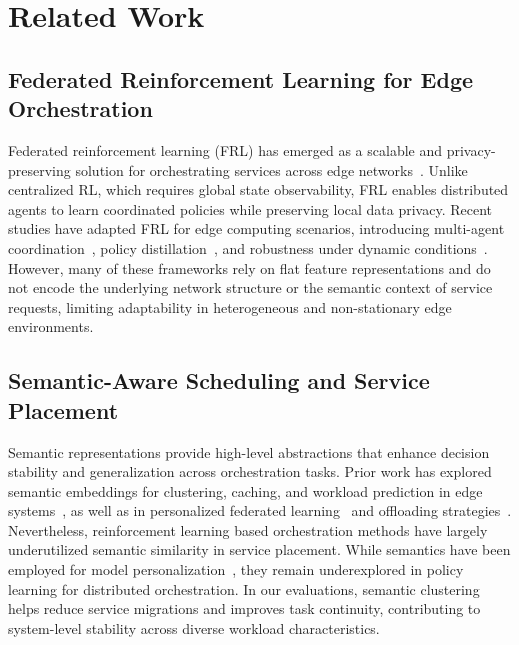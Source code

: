 \section{Related Work}
\label{sec:related}

\subsection{Federated Reinforcement Learning for Edge Orchestration}

Federated reinforcement learning (FRL) has emerged as a scalable and privacy-preserving solution for orchestrating services across edge networks~\cite{Wang2023_FedRLReview,Zhang2024_FedEdgeSurvey}. Unlike centralized RL, which requires global state observability, FRL enables distributed agents to learn coordinated policies while preserving local data privacy. Recent studies have adapted FRL for edge computing scenarios, introducing multi-agent coordination~\cite{Zhou2023_MARLFed}, policy distillation~\cite{Zhang2023_PolicyDistillFL}, and robustness under dynamic conditions~\cite{Nguyen2024_FedRLDynamic}. However, many of these frameworks rely on flat feature representations and do not encode the underlying network structure or the semantic context of service requests, limiting adaptability in heterogeneous and non-stationary edge environments.

\subsection{Semantic-Aware Scheduling and Service Placement}

Semantic representations provide high-level abstractions that enhance decision stability and generalization across orchestration tasks. Prior work has explored semantic embeddings for clustering, caching, and workload prediction in edge systems~\cite{Liu2024_SemanticEdge,Sun2024_SemanticScheduling}, as well as in personalized federated learning~\cite{Hu2023_PersonalizedFL} and offloading strategies~\cite{He2024_SemanticRL}. Nevertheless, reinforcement learning based orchestration methods have largely underutilized semantic similarity in service placement. While semantics have been employed for model personalization~\cite{Li2023_SemanticFL}, they remain underexplored in policy learning for distributed orchestration. In our evaluations, semantic clustering helps reduce service migrations and improves task continuity, contributing to system-level stability across diverse workload characteristics.

